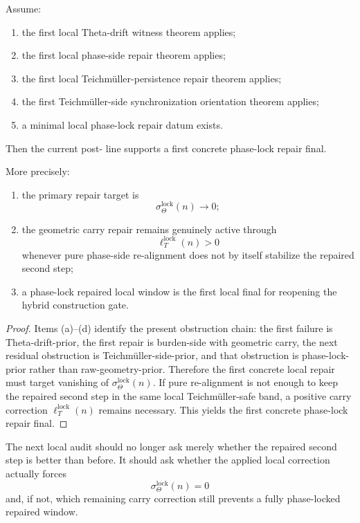 \begin{theorem}
\label{thm:first-phase-lock-repair-theorem}
Assume:
\begin{enumerate}[leftmargin=2em,label=(\alph*)]
 \item the first local Theta-drift witness theorem applies;
 \item the first local phase-side repair theorem applies;
 \item the first local Teichm\"uller-persistence repair theorem applies;
 \item the first Teichm\"uller-side synchronization orientation theorem applies;
 \item a minimal local phase-lock repair datum exists.
\end{enumerate}
Then the current post- line supports a first concrete phase-lock repair final.

More precisely:
\begin{enumerate}[leftmargin=2em,label=(\roman*)]
 \item the primary repair target is
 \[
 \sigma_{\Theta}^{\mathrm{lock}}(n) \to 0;
 \]
 \item the geometric carry repair remains genuinely active through
 \[
 \ell_T^{\mathrm{lock}}(n)>0
 \]
 whenever pure phase-side re-alignment does not by itself stabilize the repaired second step;
 \item a phase-lock repaired local window is the first local final for reopening the hybrid construction gate.
\end{enumerate}
\end{theorem}

\begin{proof}
Items (a)--(d) identify the present obstruction chain: the first failure is Theta-drift-prior, the first repair is burden-side with geometric carry, the next residual obstruction is Teichm\"uller-side-prior, and that obstruction is phase-lock-prior rather than raw-geometry-prior. Therefore the first concrete local repair must target vanishing of $\sigma_{\Theta}^{\mathrm{lock}}(n)$. If pure re-alignment is not enough to keep the repaired second step in the same local Teichm\"uller-safe band, a positive carry correction $\ell_T^{\mathrm{lock}}(n)$ remains necessary. This yields the first concrete phase-lock repair final.
\end{proof}

\begin{corollary}
\label{cor:current-phase-lock-repair-working-rule}
The next local audit should no longer ask merely whether the repaired second step is better than before. It should ask whether the applied local correction actually forces
\[
 \sigma_{\Theta}^{\mathrm{lock}}(n)=0
\]
and, if not, which remaining carry correction still prevents a fully phase-locked repaired window.
\end{corollary}

